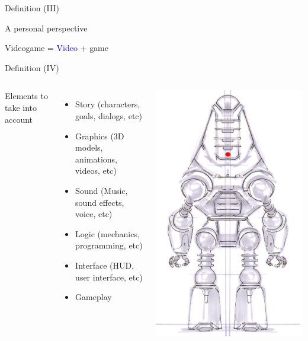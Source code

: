 \documentclass[10pt,compress]{beamer} %
\begin{document}
\begin{frame}{Definition (III)}
	\begin{center}
	A personal perspective
	\end{center}

	\begin{center}
	\huge Videogame = \textcolor{blue}{Video} + \alert{game}
	\end{center}

\end{frame}

\begin{frame}{Definition (IV)}
    \begin{columns}
		Elements to take into account

 	 	\begin{itemize}
		\item Story (characters, goals, dialogs, etc)
		\item Graphics (3D models, animations, videos, etc)
		\item Sound (Music, sound effects, voice, etc)
		\item Logic (mechanics, programming, etc)
		\item Interface (\alert{HUD}, \alert{user interface}, etc)
		\item \alert{Gameplay}
		\end{itemize}

		\centering\includegraphics[width=0.7\linewidth]{figs/ProtectronCA2}\\
	\end{columns}
\end{frame}
\end{document}
